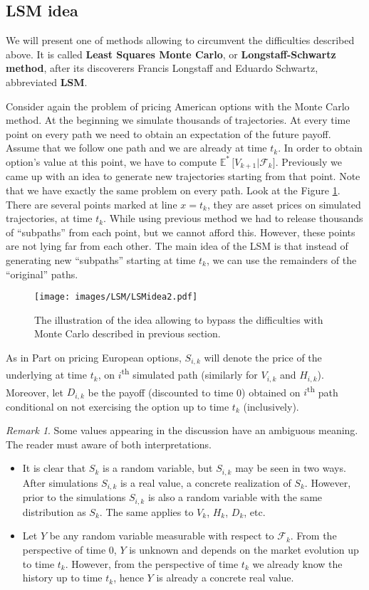 \documentclass[a4paper,11pt, twoside]{book}
\theoremstyle{definition}
\theoremstyle{remark}
\newtheorem{remark}{Remark}[chapter]
\def\Em{{\mathbb{E}^*}\,}
\begin{document}
\subsection{LSM idea}
We will present one of methods allowing to circumvent the difficulties described above. It is called \textbf{Least Squares Monte Carlo}, or \textbf{Longstaff-Schwartz method}, after its discoverers Francis Longstaff and Eduardo Schwartz, abbreviated \textbf{LSM}.

Consider again the problem of pricing American options with the Monte Carlo method. At the beginning we simulate thousands of trajectories. At every time point on every path we need to obtain an expectation of the future payoff. Assume that we follow one path and we are already at time $t_k$. In order to obtain option's value at this point, we have to compute $\Em\bigl[ V_{k+1} | \mathcal{F}_{k} \bigr]$. Previously we came up with an idea to generate new trajectories starting from that point.
Note that we have exactly the same problem on every path. Look at the Figure \ref{fig:LSMidea}. There are several points marked at line $x = t_k$, they are asset prices on simulated trajectories, at time $t_k$. While using previous method we had to release thousands of ``subpaths'' from each point, but we cannot afford this. However, these points are not lying far from each other. The main idea of the LSM is that instead of generating new ``subpaths'' starting at time $t_k$, we can use the remainders of the ``original'' paths.

\begin{figure}[!ht]
\centering
 \texttt{[image: images/LSM/LSMidea2.pdf]}
\caption{The illustration of the idea allowing to bypass the difficulties with Monte Carlo described in previous section.}
\label{fig:LSMidea}
\end{figure}

As in Part on pricing European options, $S_{i,k}$ will denote the price of the underlying at time $t_k$, on $i$\textsuperscript{th} simulated path (similarly for $V_{i,k}$ and $H_{i,k}$). Moreover, let $D_{i,k}$ be the payoff (discounted to time 0) obtained on $i$\textsuperscript{th} path conditional on not exercising the option up to time $t_k$ (inclusively).
\begin{remark}
  Some values appearing in the discussion have an ambiguous meaning. The reader must aware of both interpretations.
 \begin{itemize}
  \item It is clear that $S_{k}$ is a random variable, but $S_{i,k}$ may be seen in two ways. After simulations $S_{i,k}$ is a real value, a concrete realization of $S_{k}$. However, prior to the simulations $S_{i,k}$ is also a random variable with the same distribution as $S_k$. The same applies to  $V_k$, $H_k$, $D_k$, etc.
  \item Let $Y$ be any random variable measurable with respect to $\mathcal{F}_k$. From the perspective of time 0, $Y$ is unknown and depends on the market evolution up to time $t_k$. However, from the perspective of time $t_k$ we already know the history up to time $t_k$, hence $Y$ is already a concrete real value.
 \end{itemize}
\end{remark}
\end{document}
